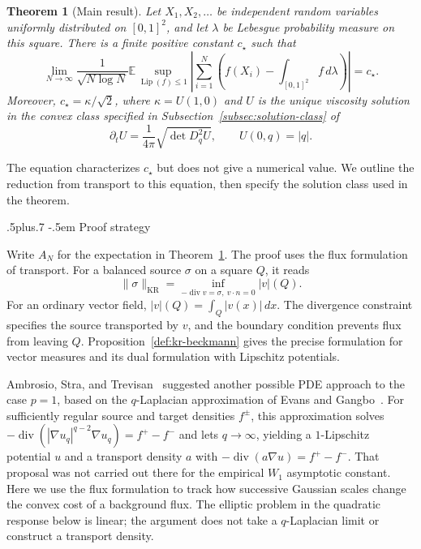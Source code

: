 \documentclass[11pt,reqno]{amsart}
\makeatletter
\def\subsection{\@startsection{subsection}{2}{0pt}%
  {.5\linespacing plus.7\linespacing}
  {-.5em}
  {\normalfont\scshape}}
\theoremstyle{plain}
\newtheorem{theorem}{Theorem}[section]
\theoremstyle{definition}
\theoremstyle{remark}
\numberwithin{equation}{section}
\newcommand{\1}{\mathbf 1}
\newcommand{\KR}{\mathrm{KR}}
\newcommand{\Lip}{\operatorname{Lip}}
\makeatother
\begin{document}
\begin{theorem}[Main result]\label{thm:intro-main}
Let \(X_1,X_2,\ldots\) be independent random variables uniformly distributed
on \([0,1]^2\), and let \(\lambda\) be Lebesgue probability measure on this
square.  There is a finite positive constant \(c_\star\) such that
\[
\lim_{N\to\infty}\frac1{\sqrt{N\log N}}
\mathbb E\sup_{\Lip(f)\leq1}
\left|\sum_{i=1}^N\left(f(X_i)-\int_{[0,1]^2}f\,d\lambda\right)\right|
=c_\star.
\]
Moreover, \(c_\star=\kappa/\sqrt2\), where \(\kappa=U(1,0)\) and \(U\) is
the unique viscosity solution in the convex class specified in
Subsection~\ref{subsec:solution-class} of
\[
\partial_tU=\frac1{4\pi}\sqrt{\det D_q^2U},
\qquad U(0,q)=|q|.
\]
\end{theorem}

The equation characterizes $c_\star$ but does not give a numerical value.
We outline the reduction from transport to this equation, then specify
the solution class used in the theorem.

\subsection{Proof strategy}\label{subsec:proof-roadmap}

Write $A_N$ for the expectation in Theorem~\ref{thm:intro-main}.
The proof uses the flux formulation of transport.  For a balanced source
$\sigma$ on a square $Q$, it reads
\[
\|\sigma\|_{\KR}
=\inf_{-\operatorname{div}v=\sigma,\ v\cdot n=0}|v|(Q).
\]
For an ordinary vector field, $|v|(Q)=\int_Q|v(x)|\,dx$.
The divergence constraint specifies the source transported by $v$, and
the boundary condition prevents flux from leaving $Q$.
Proposition~\ref{def:kr-beckmann} gives the precise formulation for vector
measures and its dual formulation with Lipschitz potentials.

Ambrosio, Stra, and Trevisan~\cite[Sec.~6]{AmbrosioStraTrevisan2019}
suggested another possible PDE approach to the case $p=1$, based on the
$q$-Laplacian approximation of Evans and Gangbo~\cite{EvansGangbo1999}.
For sufficiently regular source and target densities $f^\pm$, this
approximation solves
$-\operatorname{div}(|\nabla u_q|^{q-2}\nabla u_q)=f^+-f^-$
and lets $q\to\infty$, yielding a $1$-Lipschitz potential $u$ and a
transport density $a$ with $-\operatorname{div}(a\nabla u)=f^+-f^-$.
That proposal was not carried out there for the empirical $W_1$
asymptotic constant.  Here we use the flux formulation to track how
successive Gaussian scales change the convex cost of a background flux.
The elliptic problem in the quadratic response below is linear; the
argument does not take a $q$-Laplacian limit or construct a transport
density.
\end{document}
